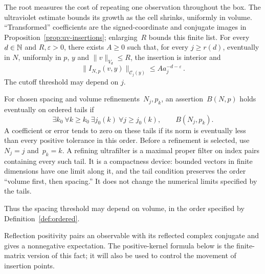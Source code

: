 The root measures the cost of repeating one observation throughout the box. The ultraviolet estimate bounds its growth as the cell shrinks, uniformly in volume. “Transformed” coefficients are the signed-coordinate and conjugate images in Proposition~\ref{prop:uv-insertions}; enlarging~$R$ bounds this finite list.
For every $d\in\mathbb N$ and $R,\varepsilon>0$, there exists $A\ge0$ such that, for every $j\ge r(d)$, eventually in $N$, uniformly in $p$, $y$ and $\|v\|_{V_d}\le R$, the insertion is interior and
\begin{equation}\label{eq:iv-centered}
\|I_{N,p}(v,y)\|_{\mathcal C_j(y)}\le A a_j^{-d-\varepsilon}\,.
\end{equation}
The cutoff threshold may depend on $j$.


\begin{definition}\label{def:iv-tails}
For chosen spacing and volume refinements~$N_j,p_k$, an assertion~$B(N,p)$ holds eventually on ordered tails if
\begin{equation}\label{eq:iv-tails}
 \exists k_0\ \forall k\ge k_0\ \exists j_0(k)\ \forall j\ge j_0(k),
 \qquad B(N_j,p_k).
\end{equation}
A coefficient or error tends to zero on these tails if its norm is eventually less than every positive tolerance in this order.
Before a refinement is selected, use~$N_j=j$ and~$p_k=k$.
A refining ultrafilter is a maximal proper filter on index pairs containing every such tail. It is a compactness device: bounded vectors in finite dimensions have one limit along it, and the tail condition preserves the order “volume first, then spacing.” It does not change the numerical limits specified by the tails.
\end{definition}

Thus the spacing threshold may depend on volume, in the order specified by Definition~\ref{def:ordered}.

Reflection positivity pairs an observable with its reflected complex conjugate and gives a nonnegative expectation. The positive-kernel formula below is the finite-matrix version of this fact; it will also be used to control the movement of insertion points.

